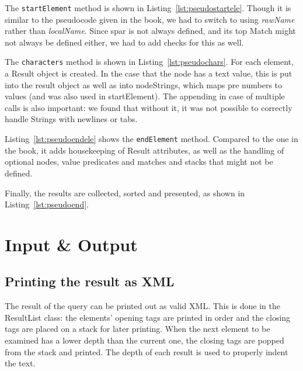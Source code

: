 \documentclass[11pt]{article}
\begin{document}

The \lstinline{startElement} method is shown in Listing~\ref{lst:pseudostartele}. Though it is similar to the pseudocode given in the book, we had to switch to using \emph{rawName} rather than \emph{localName}. Since spar is not always defined, and its top Match might not always be defined either, we had to add checks for this as well.


The \lstinline{characters} method is shown in Listing~\ref{lst:pseudochars}. For each element, a Result object is created. 
In the case that the node has a text value, this is put into the result object as well as into nodeStrings, which maps pre numbers to values (and was also used in startElement).
The appending in case of multiple calls is also important: we found that without it, it was not possible to correctly handle Strings with newlines or tabs.


Listing~\ref{lst:pseudoendele} shows the \lstinline{endElement} method. Compared to the one in the book, it adds housekeeping of Result attributes, as well as the handling of optional nodes, value predicates and matches and stacks that might not be defined.


Finally, the results are collected, sorted and presented, as shown in Listing~\ref{lst:pseudoend}.

\section{Input \& Output}
\subsection{Printing the result as XML}
The result of the query can be printed out as valid XML. This is done in the ResultList class: the elements' opening tags are printed in order and the closing tags are placed on a stack for later printing. When the next element to be examined has a lower depth than the current one, the closing tags are popped from the stack and printed. The depth of each result is used to properly indent the text.
\end{document}
